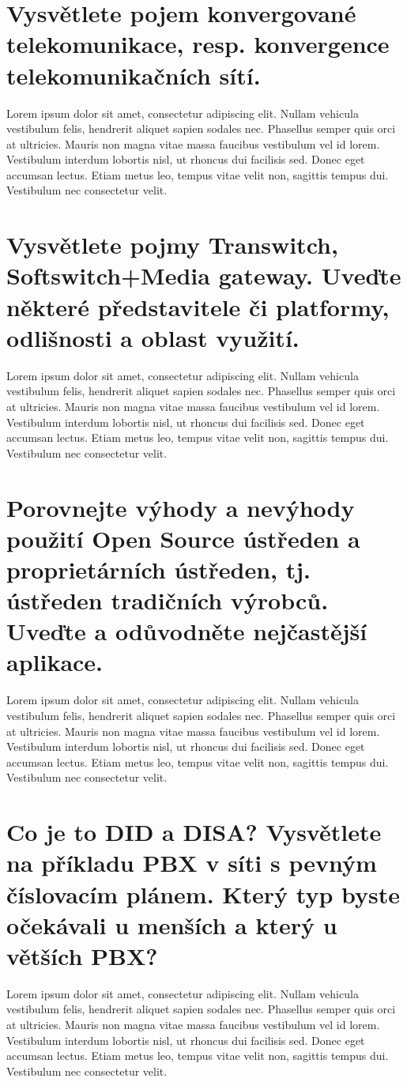 \section{Vysvětlete pojem konvergované telekomunikace, resp. konvergence telekomunikačních sítí.}
Lorem ipsum dolor sit amet, consectetur adipiscing elit. Nullam vehicula vestibulum felis, hendrerit aliquet sapien sodales nec. Phasellus semper quis orci at ultricies. Mauris non magna vitae massa faucibus vestibulum vel id lorem. Vestibulum interdum lobortis nisl, ut rhoncus dui facilisis sed. Donec eget accumsan lectus. Etiam metus leo, tempus vitae velit non, sagittis tempus dui. Vestibulum nec consectetur velit.

\section{Vysvětlete pojmy Transwitch, Softswitch+Media gateway. Uveďte některé představitele či platformy, odlišnosti a oblast využití.}
Lorem ipsum dolor sit amet, consectetur adipiscing elit. Nullam vehicula vestibulum felis, hendrerit aliquet sapien sodales nec. Phasellus semper quis orci at ultricies. Mauris non magna vitae massa faucibus vestibulum vel id lorem. Vestibulum interdum lobortis nisl, ut rhoncus dui facilisis sed. Donec eget accumsan lectus. Etiam metus leo, tempus vitae velit non, sagittis tempus dui. Vestibulum nec consectetur velit.

\section{Porovnejte výhody a nevýhody použití Open Source ústředen a proprietárních ústředen, tj. ústředen tradičních výrobců. Uveďte a odůvodněte nejčastější aplikace.}
Lorem ipsum dolor sit amet, consectetur adipiscing elit. Nullam vehicula vestibulum felis, hendrerit aliquet sapien sodales nec. Phasellus semper quis orci at ultricies. Mauris non magna vitae massa faucibus vestibulum vel id lorem. Vestibulum interdum lobortis nisl, ut rhoncus dui facilisis sed. Donec eget accumsan lectus. Etiam metus leo, tempus vitae velit non, sagittis tempus dui. Vestibulum nec consectetur velit.

\section{Co je to DID a DISA? Vysvětlete na příkladu PBX v síti s pevným číslovacím plánem. Který typ byste očekávali u menších a který u větších PBX?}
Lorem ipsum dolor sit amet, consectetur adipiscing elit. Nullam vehicula vestibulum felis, hendrerit aliquet sapien sodales nec. Phasellus semper quis orci at ultricies. Mauris non magna vitae massa faucibus vestibulum vel id lorem. Vestibulum interdum lobortis nisl, ut rhoncus dui facilisis sed. Donec eget accumsan lectus. Etiam metus leo, tempus vitae velit non, sagittis tempus dui. Vestibulum nec consectetur velit.

